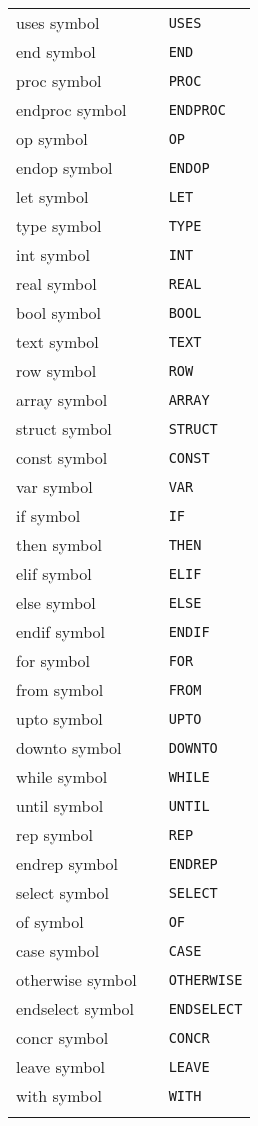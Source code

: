 \documentclass [a4paper,12pt,fleqn]{article}
\begin{document}
\begin{center}
\begin{tabular}{lll}
uses symbol & & \verb+USES+\\
end symbol & & \verb+END+\\
proc symbol & & \verb+PROC+\\
endproc symbol & & \verb+ENDPROC+\\
op symbol & & \verb+OP+\\
endop symbol & & \verb+ENDOP+\\
let symbol & & \verb+LET+\\
type symbol & & \verb+TYPE+\\
int symbol & & \verb+INT+\\ 
real symbol & & \verb+REAL+\\
bool symbol & & \verb+BOOL+\\
text symbol & & \verb+TEXT+\\
row symbol & & \verb+ROW+\\
array symbol & & \verb+ARRAY+\\
struct symbol & & \verb+STRUCT+\\
const symbol & & \verb+CONST+\\
var symbol & & \verb+VAR+\\
if symbol & & \verb+IF+\\
then symbol & & \verb+THEN+\\
elif symbol & & \verb+ELIF+\\
else symbol & & \verb+ELSE+\\
endif symbol & & \verb+ENDIF+\\
for symbol & & \verb+FOR+\\
from symbol & & \verb+FROM+\\
upto symbol & & \verb+UPTO+\\
downto symbol & & \verb+DOWNTO+\\
while symbol & & \verb+WHILE+\\ 
until symbol & & \verb+UNTIL+\\
rep symbol & & \verb+REP+\\
endrep symbol & & \verb+ENDREP+\\
select symbol & & \verb+SELECT+\\
of symbol & & \verb+OF+\\
case symbol & & \verb+CASE+\\
otherwise symbol & & \verb+OTHERWISE+\\
endselect symbol & & \verb+ENDSELECT+\\
concr symbol & & \verb+CONCR+\\
leave symbol & & \verb+LEAVE+\\
with symbol & & \verb+WITH+\\
\hspace*{8em} & \hspace*{2em} & \hspace*{8em}
\end {tabular}
\end {center}
\end{document}
